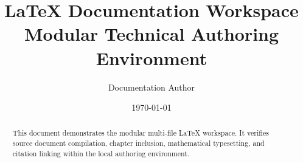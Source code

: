 \documentclass[11pt,a4paper]{article}
\title{\textbf{LaTeX Documentation Workspace}\\ \large Modular Technical Authoring Environment}
\author{Documentation Author}
\date{\today}
\begin{document}
\maketitle

\begin{abstract}
This document demonstrates the modular multi-file LaTeX workspace. It verifies source document compilation, chapter inclusion, mathematical typesetting, and citation linking within the local authoring environment.
\end{abstract}

\tableofcontents
\newpage



\newpage


\end{document}
